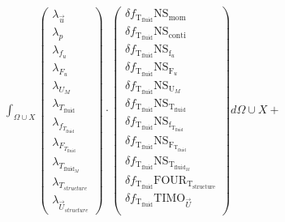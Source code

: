 \documentclass[10pt]{article} %
\begin{document}
\begin{center}
		$\int_{\Omega \cup X}
	\begin{pmatrix}
		\lambda_{\vec{u}} \\ \lambda_p \\ \lambda_{f_u} \\ \lambda_{F_u} \\ \lambda_{U_M}\\ \lambda_{T_{\text{fluid}}} \\ \lambda_{f_{T_{\text{fluid}}}} \\ \lambda_{F_{T_{\text{fluid}}}} \\ \lambda_{T_{\text{fluid}_M}} \\ \lambda_{T_{structure}} \\ \lambda_{\vec{U}_{structure}}
	\end{pmatrix}
	\cdot
	\begin{pmatrix}
		\delta f_{\text{T}_{\text{fluid}}} \text{NS}_{\text{mom}} \\
		\delta f_{\text{T}_{\text{fluid}}} \text{NS}_{\text{conti}}\\
		\delta f_{\text{T}_{\text{fluid}}} \text{NS}_{\text{f}_u} \\
		\delta f_{\text{T}_{\text{fluid}}} \text{NS}_{\text{F}_u} \\
		\delta f_{\text{T}_{\text{fluid}}} \text{NS}_{\text{U}_M} \\
		\delta f_{\text{T}_{\text{fluid}}} \text{NS}_{\text{T}_{\text{fluid}}} \\
		\delta f_{\text{T}_{\text{fluid}}} \text{NS}_{\text{f}_{\text{T}_{\text{fluid}}}}\\
		\delta f_{\text{T}_{\text{fluid}}} \text{NS}_{\text{F}_{\text{T}_{\text{fluid}}}}\\
		\delta f_{\text{T}_{\text{fluid}}} \text{NS}_{\text{T}_{\text{fluid}_M}}\\
		\delta f_{\text{T}_{\text{fluid}}} \text{FOUR}_{\text{T}_{\text{structure}}}\\
		\delta f_{\text{T}_{\text{fluid}}} \text{TIMO}_{\vec{U}}\\
	\end{pmatrix}
	d\Omega \cup X + $\\


\end{center}
\end{document}
